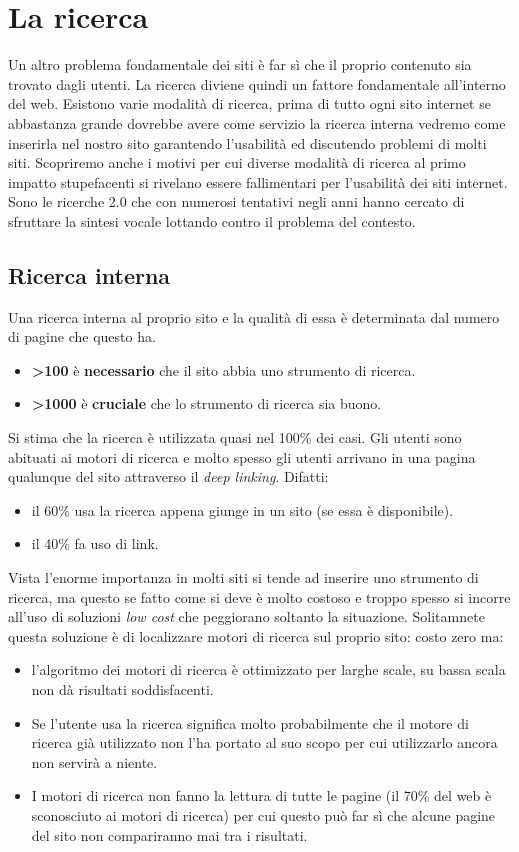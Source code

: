 
\chapter{La ricerca}
	Un altro problema fondamentale dei siti è far sì che il proprio contenuto sia trovato dagli utenti. La ricerca diviene quindi un fattore fondamentale all'interno del web. Esistono varie modalità di ricerca, prima di tutto ogni sito internet se abbastanza grande dovrebbe avere come servizio la ricerca interna vedremo come inserirla nel nostro sito garantendo l'usabilità ed discutendo problemi di molti siti. Scopriremo anche i motivi per cui diverse modalità di ricerca al primo impatto stupefacenti si rivelano essere fallimentari per l'usabilità dei siti internet. Sono le ricerche 2.0 che con numerosi tentativi negli anni hanno cercato di sfruttare la sintesi vocale lottando contro il problema del contesto.

	\section{Ricerca interna}
		Una ricerca interna al proprio sito e la qualità di essa è determinata dal numero di pagine che questo ha.
		\begin{itemize}
			\item \textbf{>100} è \textbf{necessario} che il sito abbia uno strumento di ricerca.
			\item \textbf{>1000} è \textbf{cruciale} che lo strumento di ricerca sia buono.
		\end{itemize}
		Si stima che la ricerca è utilizzata quasi nel 100\% dei casi. Gli utenti sono abituati ai motori di ricerca e molto spesso gli utenti arrivano in una pagina qualunque del sito attraverso il \emph{deep linking}. Difatti:
		\begin{itemize}
			\item il 60\% usa la ricerca appena giunge in un sito (se essa è disponibile).
			\item il 40\% fa uso di link.
		\end{itemize}
		
		Vista l'enorme importanza in molti siti si tende ad inserire uno strumento di ricerca, ma questo se fatto come si deve è molto costoso e troppo spesso si incorre all'uso di soluzioni \emph{low cost} che peggiorano soltanto la situazione. Solitamnete questa soluzione è di localizzare motori di ricerca sul proprio sito: costo zero ma:
		\begin{itemize}
			\item l'algoritmo dei motori di ricerca è ottimizzato per larghe scale, su bassa scala non dà risultati soddisfacenti.
			\item Se l'utente usa la ricerca significa molto probabilmente che il motore di ricerca già utilizzato non l'ha portato al suo scopo per cui utilizzarlo ancora non servirà a niente.
			\item I motori di ricerca non fanno la lettura di tutte le pagine (il 70\% del web è sconosciuto ai motori di ricerca) per cui questo può far sì che alcune pagine del sito non compariranno mai tra i risultati.
		\end{itemize}			
	
